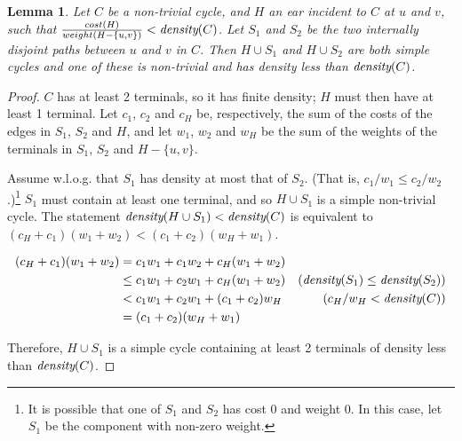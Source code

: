 \documentclass[11pt]{article}
\newtheorem{lemma}{Lemma}[section]
\newcommand{\dens}[1]{\emph{density}(#1)}
\begin{document}
\begin{lemma}\label{lem:goodEar}
  Let $C$ be a non-trivial cycle, and $H$ an ear incident to $C$ at
  $u$ and $v$, such that $\frac{cost(H)}{weight(H - \{u,v\})} <
  \dens{C}$. Let $S_1$ and $S_2$ be the two internally disjoint paths
  between $u$ and $v$ in $C$. Then $H \cup S_1$ and $H \cup S_2$ are
  both simple cycles and one of these is non-trivial and has density
  less than $\dens{C}$.
\end{lemma}
\begin{proof}
  $C$ has at least 2 terminals, so it has finite density; $H$ must
  then have at least 1 terminal. Let $c_1$, $c_2$ and $c_H$ be,
  respectively, the sum of the costs of the edges in $S_1$, $S_2$ and
  $H$, and let $w_1$, $w_2$ and $w_H$ be the sum of the weights of the
  terminals in $S_1$, $S_2$ and $H-\{u,v\}$.

  Assume w.l.o.g. that $S_1$ has density at most that of $S_2$. (That
  is, $c_1/w_1 \le c_2/w_2$.)\footnote{It is possible that one of
    $S_1$ and $S_2$ has cost 0 and weight 0. In this case, let $S_1$
    be the component with non-zero weight.}  $S_1$ must contain at
  least one terminal, and so $H \cup S_1$ is a simple non-trivial
  cycle.  The statement $\dens{H \cup S_1} < \dens{C}$ is equivalent
  to $(c_H + c_1)(w_1 + w_2) < (c_1 + c_2) (w_H + w_1)$.
  \vspace{-0.2in}

  \begin{align*}
    (c_H + c_1)(w_1 + w_2) &= c_1w_1 + c_1w_2 + c_H(w_1 + w_2)\\
    &\le c_1w_1 + c_2w_1 + c_H(w_1 + w_2) & (\dens{S_1} \le \dens{S_2})\\
    &< c_1w_1 + c_2w_1 + (c_1 + c_2)w_H   & (c_H/w_H < \dens{C})\\
    &= (c_1 + c_2) (w_H + w_1)\\
  \end{align*}

  \vspace{-0.2in}
  Therefore, $H \cup S_1$ is a simple cycle containing at least 2 terminals of
  density less than $\dens{C}$.
\end{proof}
\end{document}
